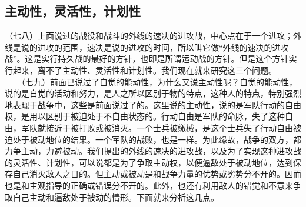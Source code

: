 \documentclass[cn,11pt,chinese]{elegantbook}
\def\myformat#1{\hfil\hfil #1}
\begin{document}
\subsection*{\myformat{主动性，灵活性，计划性}}
（七八）上面说过的战役和战斗的外线的速决的进攻战，中心点在于一个进攻；外线是说的进攻的范围，速决是说的进攻的时间，所以叫它做“外线的速决的进攻战”。这是实行持久战的最好的方针，也即是所谓运动战的方针。但是这个方针实行起来，离不了主动性、灵活性和计划性。我们现在就来研究这三个问题。\\
　　（七九）前面已说过了自觉的能动性，为什么又说主动性呢？自觉的能动性，说的是自觉的活动和努力，是人之所以区别于物的特点，这种人的特点，特别强烈地表现于战争中，这些是前面说过了的。这里说的主动性，说的是军队行动的自由权，是用以区别于被迫处于不自由状态的。行动自由是军队的命脉，失了这种自由，军队就接近于被打败或被消灭。一个士兵被缴械，是这个士兵失了行动自由被迫处于被动地位的结果。一个军队的战败，也是一样。为此缘故，战争的双方，都力争主动，力避被动。我们提出的外线的速决的进攻战，以及为了实现这种进攻战的灵活性、计划性，可以说都是为了争取主动权，以便逼敌处于被动地位，达到保存自己消灭敌人之目的。但主动或被动是和战争力量的优势或劣势分不开的。因而也是和主观指导的正确或错误分不开的。此外，也还有利用敌人的错觉和不意来争取自己主动和逼敌处于被动的情形。下面就来分析这几点。\\
\end{document}
